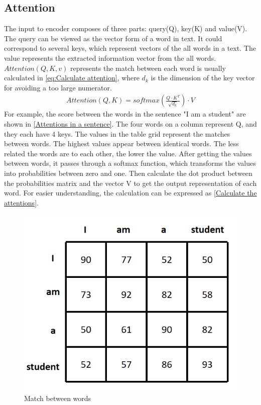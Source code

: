 \subsection{Attention}
  The input to encoder composes of three parts:
  query(Q), key(K) and value(V). The query can be viewed as the vector form of a word in text. It could correspond to several keys, which represent vectors of the all words 
  in a text. The value represents the extracted information vector from the all words. $Attention(Q, K, v)$ represents the match between each word
  is usually calculated in \autoref{eq:Calculate attention}, where $d_k$ is the dimension of the key vector for avoiding a too large numerator. 
  \begin{equation}
    \begin{aligned}
      Attention(Q,K)=softmax(\frac{Q\cdot K^T}{\sqrt{d_{k}}}) \cdot V 
        \label{eq:Calculate attention}
    \end{aligned}
  \end{equation}
  For example, the score between the words in the sentence "I am a student" are shown in \autoref{Attentions in a sentence}. The four words on a column represent Q, and they each have 4 
  keys. The values in the table grid represent the matches between words. The highest values appear between identical words. The less related the words are to each other, the lower the 
  value. After getting the values between words, it passes through a softmax function, which transforms the values into probabilities between zero and one. Then calculate the dot product
  between the probabilities matrix and the vector V to get the output representation of each word. For easier understanding, the calculation can be expressed as \autoref{Calculate the attentions}.
  \begin{figure}
    \centering
    \includegraphics[width=0.6\linewidth]{example_images/IamAStudent}
    \caption{Match between words}
    \label{Attentions in a sentence}
  \end{figure}
